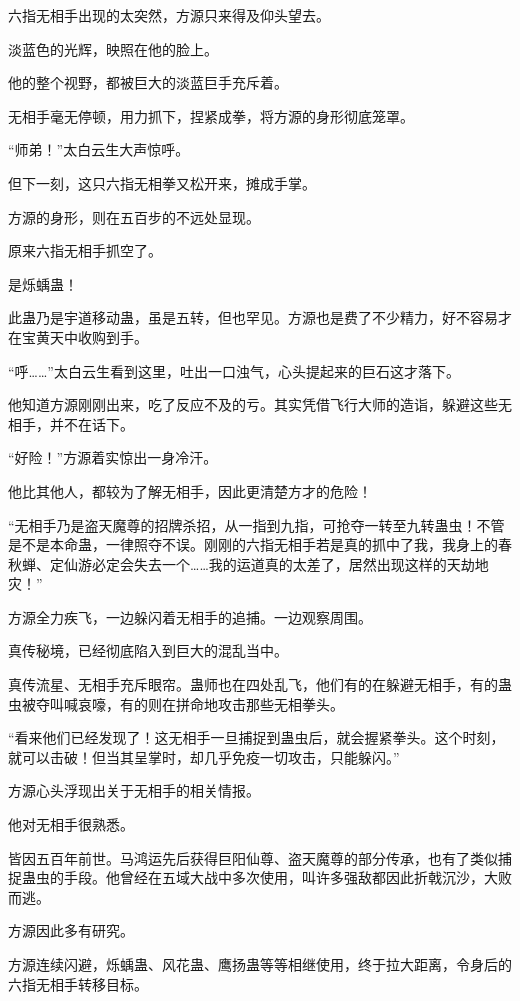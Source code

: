
\begin{this_body}

六指无相手出现的太突然，方源只来得及仰头望去。

淡蓝色的光辉，映照在他的脸上。

他的整个视野，都被巨大的淡蓝巨手充斥着。

无相手毫无停顿，用力抓下，捏紧成拳，将方源的身形彻底笼罩。

“师弟！”太白云生大声惊呼。

但下一刻，这只六指无相拳又松开来，摊成手掌。

方源的身形，则在五百步的不远处显现。

原来六指无相手抓空了。

是烁蝺蛊！

此蛊乃是宇道移动蛊，虽是五转，但也罕见。方源也是费了不少精力，好不容易才在宝黄天中收购到手。

“呼……”太白云生看到这里，吐出一口浊气，心头提起来的巨石这才落下。

他知道方源刚刚出来，吃了反应不及的亏。其实凭借飞行大师的造诣，躲避这些无相手，并不在话下。

“好险！”方源着实惊出一身冷汗。

他比其他人，都较为了解无相手，因此更清楚方才的危险！

“无相手乃是盗天魔尊的招牌杀招，从一指到九指，可抢夺一转至九转蛊虫！不管是不是本命蛊，一律照夺不误。刚刚的六指无相手若是真的抓中了我，我身上的春秋蝉、定仙游必定会失去一个……我的运道真的太差了，居然出现这样的天劫地灾！”

方源全力疾飞，一边躲闪着无相手的追捕。一边观察周围。

真传秘境，已经彻底陷入到巨大的混乱当中。

真传流星、无相手充斥眼帘。蛊师也在四处乱飞，他们有的在躲避无相手，有的蛊虫被夺叫喊哀嚎，有的则在拼命地攻击那些无相拳头。

“看来他们已经发现了！这无相手一旦捕捉到蛊虫后，就会握紧拳头。这个时刻，就可以击破！但当其呈掌时，却几乎免疫一切攻击，只能躲闪。”

方源心头浮现出关于无相手的相关情报。

他对无相手很熟悉。

皆因五百年前世。马鸿运先后获得巨阳仙尊、盗天魔尊的部分传承，也有了类似捕捉蛊虫的手段。他曾经在五域大战中多次使用，叫许多强敌都因此折戟沉沙，大败而逃。

方源因此多有研究。

方源连续闪避，烁蝺蛊、风花蛊、鹰扬蛊等等相继使用，终于拉大距离，令身后的六指无相手转移目标。


\end{this_body}
